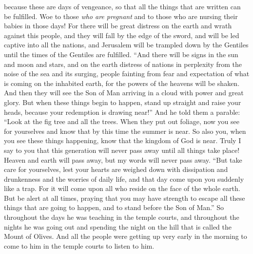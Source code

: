 \begin{biblechapter}
\verse because these are days of vengeance, so that all the things that are written can be fulfilled.
\verse Woe to those \textit{who are pregnant} and to those who are nursing their babies in those days! For there will be great distress on the earth and wrath against this people,
\verse and they will fall by the edge of the sword, and will be led captive into all the nations, and Jerusalem will be trampled down by the Gentiles until the times of the Gentiles are fulfilled.
 “And there will be signs in the sun and moon and stars, and on the earth distress of nations in perplexity from the noise of the sea and its surging,
\verse people fainting from fear and expectation of what is coming on the inhabited earth, for the powers of the heavens will be shaken.
\verse And then they will see the Son of Man arriving in a cloud with power and great glory.
\verse But when these things begin to happen, stand up straight and raise your heads, because your redemption is drawing near!”
 And he told them a parable: “Look at the fig tree and all the trees.
\verse When they put out foliage, now you see for yourselves and know that by this time the summer is near.
\verse So also you, when you see these things happening, know that the kingdom of God is near.
\verse Truly I say to you that this generation will never pass away until all things take place!
\verse Heaven and earth will pass away, but my words will never pass away.
 “But take care for yourselves, lest your hearts are weighed down with dissipation and drunkenness and the worries of daily life, and that day come upon you suddenly
\verse like a trap. For it will come upon all who reside on the face of the whole earth.
\verse But be alert at all times, praying that you may have strength to escape all these things that are going to happen, and to stand before the Son of Man.”
\verse So throughout the days he was teaching in the temple courts, and throughout the nights he was going out and spending the night on the hill that is called the Mount of Olives.
\verse And all the people were getting up very early in the morning to come to him in the temple courts to listen to him.
\end{biblechapter}


